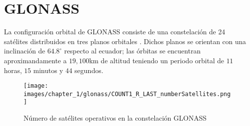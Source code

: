 \section{GLONASS}
\label{sec:glonass}

\begin{justify}
    La configuración orbital de GLONASS consiste de una constelación de 24 satélites distribuidos en tres planos orbitales \parencite{glonass_iac}.
    Dichos planos se orientan con una inclinación de $64.8^\circ$ respecto al ecuador; las órbitas se encuentran aproximandamente
    a $19,100$km de altitud teniendo un periodo orbital de $11$ horas, $15$ minutos y $44$ segundos.

    \begin{figure}[H]
        \centering
        \texttt{[image: images/chapter\_1/glonass/COUNT1\_R\_LAST\_numberSatellites.png]}
        \caption{Número de satélites operativos en la constelación GLONASS}
        \label{fig:glonass_numSatellites}
    \end{figure}


\end{justify}
